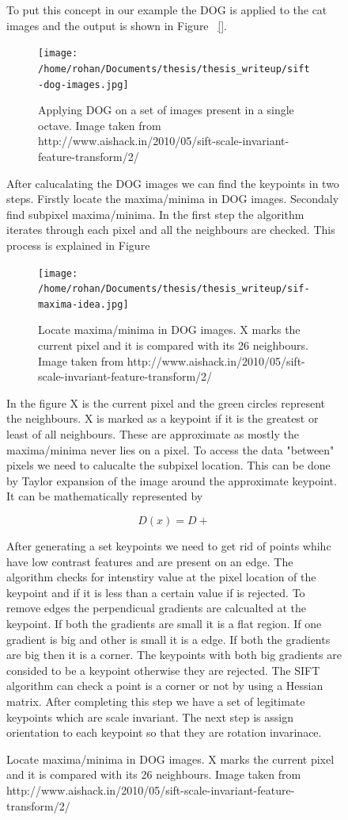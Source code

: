 \documentclass[12pt,draft]{dalcsthesis}
\begin{document}
{{\begin{figure}
To put this concept in our example the DOG is applied to the cat images and the output is shown in Figure ~\ref{}. 
\begin{figure}
  \centering
     {\texttt{[image: /home/rohan/Documents/thesis/thesis\_writeup/sift-dog-images.jpg]}}
  \caption{\label{fig- sift dog images} Applying DOG on a set of images present in a single octave. Image taken from \cite{}{http://www.aishack.in/2010/05/sift-scale-invariant-feature-transform/2/} }
\end{figure}

After calucalating the DOG images we can find the keypoints in two steps. Firstly locate the maxima/minima in DOG images. Secondaly find subpixel maxima/minima. In the first step the algorithm iterates through each pixel and all the neighbours are checked. This process is explained in Figure 

\begin{figure}
  \centering
     {\texttt{[image: /home/rohan/Documents/thesis/thesis\_writeup/sif-maxima-idea.jpg]}}
  \caption{\label{fig- sift octaves} Locate maxima/minima in DOG images. X marks the current pixel and it is compared with its 26 neighbours. Image taken from \cite{}{http://www.aishack.in/2010/05/sift-scale-invariant-feature-transform/2/} }
\end{figure}

In the figure X is the current pixel and the green circles represent the neighbours. X is marked as a keypoint if it is the greatest or least of all neighbours. These are approximate as mostly the maxima/minima never lies on a pixel. To access the data "between" pixels we need to calucalte the subpixel location. This can be done by Taylor expansion of the image around the approximate keypoint. It can be mathematically represented by 

\begin{equation}
D(x) = D + 
\end{equation}

After generating a set keypoints we need to get rid of points whihc have low contrast features and are present on an edge. The algorithm checks for intenstiry value at the pixel location of the keypoint and if it is less than a certain value if is rejected. To remove edges the perpendicual gradients are calcualted at the keypoint. If both the gradients are small it is a flat region. If one gradient is big and other is small it is a edge. If both the gradients are big then it is a corner. The keypoints with both big gradients are consided to be a keypoint otherwise they are rejected. The SIFT algorithm can check a point is a corner or not by using a Hessian matrix. After completing this step we have a set of legitimate keypoints which are scale invariant. The next step is assign orientation to each keypoint so that they are rotation invarinace. 


\end{figure}}}
\end{document}
